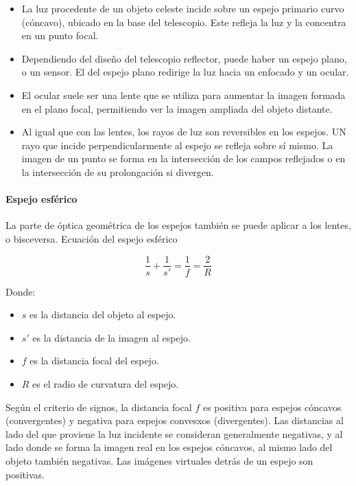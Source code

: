 \begin{itemize}
	\item La luz procedente de un objeto celeste incide sobre un espejo primario curvo (cóncavo), ubicado en la base del telescopio. Este refleja la luz y la concentra en un punto focal. 
	
	\item Dependiendo del diseño del telescopio reflector, puede haber un espejo plano, o un sensor. El del espejo plano redirige la luz hacia un enfocado y un ocular. 
	
	\item El ocular suele ser una lente que se utiliza para aumentar la imagen formada en el plano focal, permitiendo ver la imagen ampliada del objeto distante. 
	
	\item Al igual que con las lentes, los rayos de luz son reversibles en los espejos. UN rayo que incide perpendicularmente al espejo se refleja sobre sí mismo. La imagen de un punto se forma en la intersección de los campos reflejados o en la intersección de su prolongación si divergen. 
	
\end{itemize}


\paragraph{Espejo esférico} La parte de óptica geométrica de los espejos también se puede aplicar a los lentes, o bisceversa. Ecuación del espejo esférico 

\begin{equation}
	\frac{1}{s} + \frac{1}{s'} = \frac{1}{f} = \frac{2}{R}
	\label{eq:espejo_esferico}
\end{equation}

Donde:

\begin{itemize}
	\item 	$s$ es la distancia del objeto al espejo.
	
	\item $s'$ es la distancia de la imagen al espejo.
	
	\item $f$ es la distancia focal del espejo.
	
	\item $R$ es el radio de curvatura del espejo.
\end{itemize}

Según el criterio de signos, la distancia focal $f$ es positiva para espejos cóncavos (convergentes) y negativa para espejos convesxos (divergentes). Las distancias al lado del que proviene la luz incidente se consideran generalmente negativas, y al lado donde se forma la imagen real en los espejos cóncavos, al mismo lado del objeto también negativas. Las imágenes virtuales detrás de un espejo son positivas.


